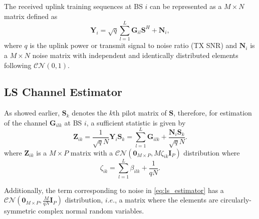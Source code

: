 \documentclass[10pt,journal,comsoc,final]{IEEEtran}
\begin{document}
The received uplink training sequences at BS $i$ can be represented as a $M \times N$ matrix defined as
\begin{equation}\label{eq:received_signal}
\textbf{Y}_{i} = \sqrt{q} \sum^{L}_{l=1}{ \textbf{G}_{il} \textbf{S}^{H} + \textbf{N}_{i}},
\end{equation}
where $q$ is the uplink power or transmit signal to noise ratio (TX SNR) and $\textbf{N}_{i}$ is a $M \times N$ noise matrix with independent and identically distributed elements following $\mathcal{CN}(0,1)$.

\subsection{LS Channel Estimator}

As showed earlier, $\textbf{S}_{k}$ denotes the $k$th pilot matrix of $\textbf{S}$, therefore, for estimation of the channel $\textbf{G}_{ilk}$ at BS $i$, a sufficient statistic is given by 
\begin{equation}\label{eq:ls_estimator}
\textbf{Z}_{ik} = \frac{1}{\sqrt{q}N} \textbf{Y}_{i} \textbf{S}_{k} = \sum_{l=1}^{L}{\textbf{G}_{ilk}} + \frac{\textbf{N}_{i}\textbf{S}_{k}}{\sqrt{q}N}.
\end{equation}
where $\textbf{Z}_{ik}$ is a $M \times P$ matrix with a $\mathcal{CN}(\textbf{0}_{M \times P},M\zeta_{ik}\textbf{I}_{P})$ distribution where
\begin{equation}\label{eq:zeta}
\zeta_{ik} = \sum_{l=1}^{L}{\beta_{ilk}} +  \frac{1}{qN}.
\end{equation}

Additionally, the term corresponding to noise in \eqref{eq:ls_estimator} has a $\mathcal{CN}(\textbf{0}_{M \times P},\frac{M}{qN}\textbf{I}_{P})$ distribution, $i.e.$, a matrix where the elements are circularly-symmetric complex normal random variables.
\end{document}
